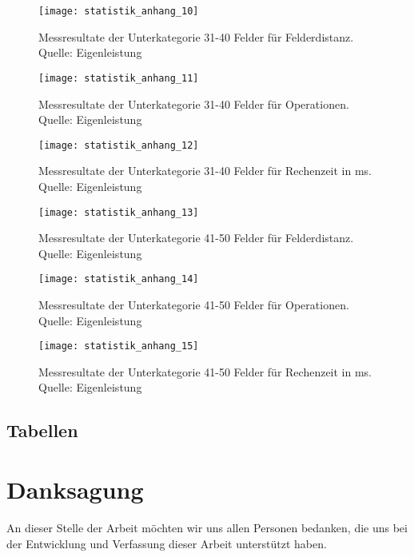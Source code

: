 \begin{figure}[H]
  \centering
  \texttt{[image: statistik\_anhang\_10]}
  \caption[Messresultate der Unterkategorie 31-40 Felder für Felderdistanz.]{Messresultate der Unterkategorie 31-40 Felder für Felderdistanz. Quelle: Eigenleistung}
\end{figure}
\begin{figure}[H]
  \centering
  \texttt{[image: statistik\_anhang\_11]}
  \caption[Messresultate der Unterkategorie 31-40 Felder für Operationen.]{Messresultate der Unterkategorie 31-40 Felder für Operationen. Quelle: Eigenleistung}
\end{figure}
\begin{figure}[H]
  \centering
  \texttt{[image: statistik\_anhang\_12]}
  \caption[Messresultate der Unterkategorie 31-40 Felder für Rechenzeit in ms.]{Messresultate der Unterkategorie 31-40 Felder für Rechenzeit in ms. Quelle: Eigenleistung}
\end{figure}
\begin{figure}[H]
  \centering
  \texttt{[image: statistik\_anhang\_13]}
  \caption[Messresultate der Unterkategorie 41-50 Felder für Felderdistanz.]{Messresultate der Unterkategorie 41-50 Felder für Felderdistanz. Quelle: Eigenleistung}
\end{figure}
\begin{figure}[H]
  \centering
  \texttt{[image: statistik\_anhang\_14]}
  \caption[Messresultate der Unterkategorie 41-50 Felder für Operationen.]{Messresultate der Unterkategorie 41-50 Felder für Operationen. Quelle: Eigenleistung}
\end{figure}
\begin{figure}[H]
  \centering
  \texttt{[image: statistik\_anhang\_15]}
  \caption[Messresultate der Unterkategorie 41-50 Felder für Rechenzeit in ms.]{Messresultate der Unterkategorie 41-50 Felder für Rechenzeit in ms. Quelle: Eigenleistung}
\end{figure}
\subsection{Tabellen}



\section{Danksagung}
An dieser Stelle der Arbeit möchten wir uns allen Personen bedanken, die uns bei der Entwicklung und Verfassung dieser Arbeit unterstützt haben.

